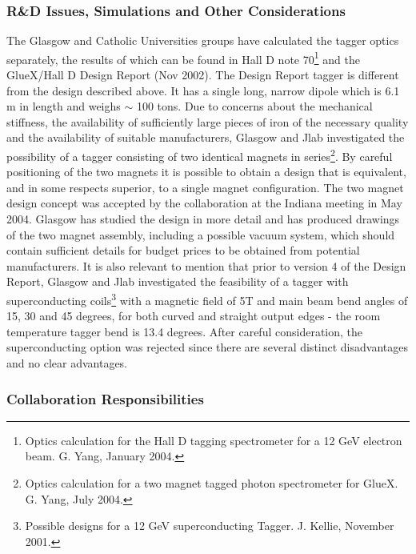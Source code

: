 \subsubsection*{R\&D Issues, Simulations and Other Considerations}
The Glasgow  and Catholic Universities groups have calculated the tagger
optics separately, the results of which can be found in Hall D
note 70\footnote{Optics calculation for the Hall D tagging spectrometer
for a 12 GeV electron beam. G. Yang, January 2004.} and the GlueX/Hall D
Design Report (Nov 2002). The Design Report tagger is different from
the design described above. It has a single long, narrow dipole which is
6.1 m in length and weighs $\sim$ 100 tons. Due to concerns about the
mechanical stiffness, the availability of sufficiently large pieces of
iron of the necessary quality and the availability of suitable
manufacturers, Glasgow  and Jlab investigated the possibility of a
tagger consisting of two identical magnets in series\footnote{Optics
calculation for a two magnet tagged photon spectrometer for GlueX.
G. Yang, July 2004.}.
By  careful positioning of the two magnets it is possible to obtain a
design that is equivalent, and in some respects superior, to a single
magnet configuration. The two magnet design concept was accepted by
the collaboration at the Indiana meeting in May 2004. Glasgow has studied
the design in more detail and has produced drawings of the two magnet
assembly, including a possible vacuum system, which should contain
sufficient details for budget prices to be obtained from potential
manufacturers.
It is also relevant to mention that prior to version 4 of the Design Report, 
Glasgow and Jlab investigated the feasibility of a tagger with superconducting 
coils\footnote{Possible designs for a 12 GeV superconducting Tagger. J. Kellie, 
November 2001.} with a magnetic field of 5T and main beam bend angles of 15, 30 
and 45 degrees, for both curved and straight output edges - the room temperature 
tagger bend is 13.4 degrees. After careful consideration, the superconducting 
option was rejected since there are several distinct disadvantages and no 
clear advantages.

\subsubsection*{Collaboration Responsibilities}

